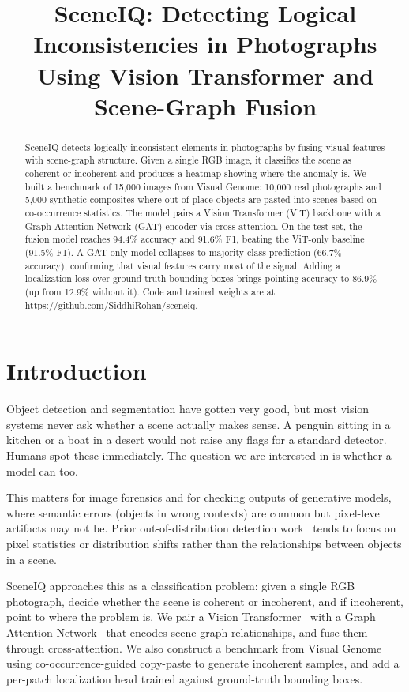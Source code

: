 \documentclass[conference]{IEEEtran}
\title{SceneIQ: Detecting Logical Inconsistencies in Photographs Using Vision Transformer and Scene-Graph Fusion}
\author{
\IEEEauthorblockN{Siddhi Rohan Chakka}
\IEEEauthorblockA{UID: 121302823\\University of Maryland}
\and
\IEEEauthorblockN{Krishna Kishore Buddi}
\IEEEauthorblockA{UID: 121142672\\University of Maryland}
\and
\IEEEauthorblockN{Dhanush Vasa}
\IEEEauthorblockA{UID: 121227645\\University of Maryland}
}
\begin{document}
\maketitle

\begin{abstract}
SceneIQ detects logically inconsistent elements in photographs by fusing visual features with scene-graph structure. Given a single RGB image, it classifies the scene as coherent or incoherent and produces a heatmap showing where the anomaly is. We built a benchmark of 15,000 images from Visual Genome: 10,000 real photographs and 5,000 synthetic composites where out-of-place objects are pasted into scenes based on co-occurrence statistics. The model pairs a Vision Transformer (ViT) backbone with a Graph Attention Network (GAT) encoder via cross-attention. On the test set, the fusion model reaches 94.4\% accuracy and 91.6\% F1, beating the ViT-only baseline (91.5\% F1). A GAT-only model collapses to majority-class prediction (66.7\% accuracy), confirming that visual features carry most of the signal. Adding a localization loss over ground-truth bounding boxes brings pointing accuracy to 86.9\% (up from 12.9\% without it). Code and trained weights are at \url{https://github.com/SiddhiRohan/sceneiq}.
\end{abstract}

\section{Introduction}

Object detection and segmentation have gotten very good, but most vision systems never ask whether a scene actually makes sense. A penguin sitting in a kitchen or a boat in a desert would not raise any flags for a standard detector. Humans spot these immediately. The question we are interested in is whether a model can too.

This matters for image forensics and for checking outputs of generative models, where semantic errors (objects in wrong contexts) are common but pixel-level artifacts may not be. Prior out-of-distribution detection work~\cite{johnson2015image,xu2017scene} tends to focus on pixel statistics or distribution shifts rather than the relationships between objects in a scene.

SceneIQ approaches this as a classification problem: given a single RGB photograph, decide whether the scene is coherent or incoherent, and if incoherent, point to where the problem is. We pair a Vision Transformer~\cite{dosovitskiy2020image} with a Graph Attention Network~\cite{velickovic2018graph} that encodes scene-graph relationships, and fuse them through cross-attention. We also construct a benchmark from Visual Genome~\cite{krishna2017visual} using co-occurrence-guided copy-paste to generate incoherent samples, and add a per-patch localization head trained against ground-truth bounding boxes.
\end{document}

